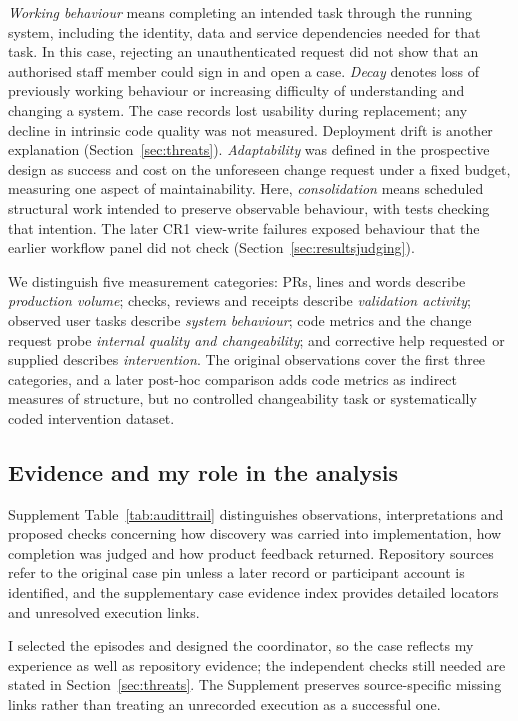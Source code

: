 \documentclass[11pt,a4paper]{article}
\begin{document}
\emph{Working behaviour} means completing an intended task through the
running system, including the identity, data and service dependencies needed
for that task. In this case, rejecting an unauthenticated request did not
show that an authorised staff member could sign in and open a case.
\emph{Decay} denotes loss of previously working behaviour or
increasing difficulty of understanding and changing a system. The case
records lost usability during replacement; any decline in intrinsic code
quality was not measured. Deployment drift is another explanation (Section~\ref{sec:threats}).
\emph{Adaptability} was defined in the prospective design as success and cost
on the unforeseen change request under a fixed budget, measuring one aspect of maintainability.
Here, \emph{consolidation} means scheduled structural work intended
to preserve observable behaviour, with tests checking that intention.
The later CR1 view-write failures exposed behaviour that the earlier
workflow panel did not check (Section~\ref{sec:resultsjudging}).

We distinguish five measurement categories: PRs, lines and words describe
\emph{production volume}; checks, reviews and receipts describe
\emph{validation activity}; observed user tasks describe \emph{system
behaviour}; code metrics and the change request probe \emph{internal quality
and changeability}; and corrective help requested or supplied describes
\emph{intervention}. The original observations cover the first three categories, and a later post-hoc comparison adds code metrics as indirect measures of structure,
but no controlled changeability task or systematically coded intervention
dataset.

\subsection{Evidence and my role in the analysis}\label{sec:audittrail}

Supplement Table~\ref{tab:audittrail} distinguishes observations, interpretations and proposed checks concerning how discovery was carried
into implementation, how completion was judged and how product feedback
returned. Repository sources refer to the original case pin unless a later
record or participant account is identified, and the supplementary case evidence index provides detailed locators and unresolved execution links.



I selected the episodes and designed the coordinator, so the case reflects
my experience as well as repository evidence; the independent checks still
needed are stated in Section~\ref{sec:threats}. The Supplement preserves
source-specific missing links rather than treating an unrecorded execution
as a successful one.
\end{document}
